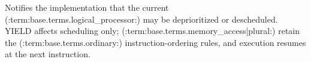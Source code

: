 Notifies the implementation that the current (:term:base.terms.logical_processor:) may be deprioritized or descheduled. YIELD affects scheduling only; (:term:base.terms.memory_access|plural:) retain the (:term:base.terms.ordinary:) instruction-ordering rules, and execution resumes at the next instruction.
